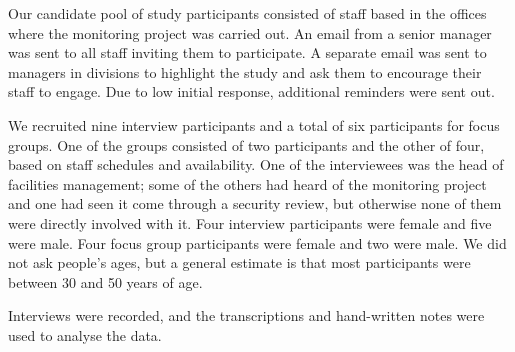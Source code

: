 Our candidate pool of study participants consisted of staff based in
the offices where the monitoring project was carried out. An email
from a senior manager was sent to all staff inviting them to
participate. A separate email was sent to managers in divisions to
highlight the study and ask them to encourage their staff to engage.
Due to low initial response, additional reminders were sent out.

We recruited nine interview participants and a total of six participants for
focus groups. One of the groups consisted of two participants and the
other of four, based on staff schedules and availability. One
of the interviewees was the head of facilities management; some of the
others had heard of the monitoring project and one had seen it come
through a security review, but otherwise none of them were directly
involved with it. Four interview participants were female and five
were male. Four focus group participants were female and two were
male. We did not ask people’s ages, but a general estimate is that
most participants were between 30 and 50 years of age.

Interviews were recorded, and the transcriptions and hand-written
notes were used to analyse the data. 

